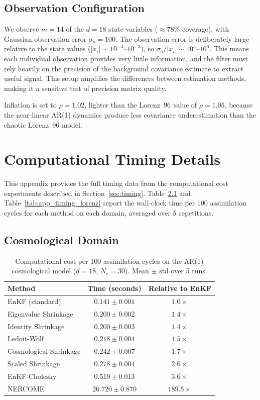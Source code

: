 \section{Observation Configuration}

We observe $m = 14$ of the $d = 18$ state variables ($\approx 78\%$ coverage), with Gaussian observation error $\sigma_o = 100$. The observation error is deliberately large relative to the state values ($|x_i| \sim 10^{-4}$--$10^{-3}$), so $\sigma_o / |x_i| \sim 10^5$--$10^6$. This means each individual observation provides very little information, and the filter must rely heavily on the precision of the background covariance estimate to extract useful signal. This setup amplifies the differences between estimation methods, making it a sensitive test of precision matrix quality.

Inflation is set to $\rho = 1.02$, lighter than the Lorenz~96 value of $\rho = 1.05$, because the near-linear AR(1) dynamics produce less covariance underestimation than the chaotic Lorenz~96 model.

\chapter{Computational Timing Details}
\label{app:timing}

This appendix provides the full timing data from the computational cost experiments described in Section~\ref{sec:timing}. Table~\ref{tab:app_timing_cosmo} and Table~\ref{tab:app_timing_lorenz} report the wall-clock time per 100 assimilation cycles for each method on each domain, averaged over 5 repetitions.

\section{Cosmological Domain}

\begin{table}[htbp]
\centering
\caption{Computational cost per 100 assimilation cycles on the AR(1) cosmological model ($d = 18$, $N_e = 30$). Mean $\pm$ std over 5 runs.}
\label{tab:app_timing_cosmo}
\begin{tabular}{@{}lcc@{}}
\toprule
Method & Time (seconds) & Relative to EnKF \\
\midrule
EnKF (standard)          & $0.141 \pm 0.001$ & $1.0\times$ \\
Eigenvalue Shrinkage     & $0.200 \pm 0.002$ & $1.4\times$ \\
Identity Shrinkage       & $0.200 \pm 0.003$ & $1.4\times$ \\
Ledoit-Wolf              & $0.218 \pm 0.004$ & $1.5\times$ \\
Cosmological Shrinkage   & $0.242 \pm 0.007$ & $1.7\times$ \\
Scaled Shrinkage         & $0.278 \pm 0.004$ & $2.0\times$ \\
EnKF-Cholesky            & $0.510 \pm 0.013$ & $3.6\times$ \\
NERCOME                  & $26.720 \pm 0.870$ & $189.5\times$ \\
\bottomrule
\end{tabular}
\end{table}

